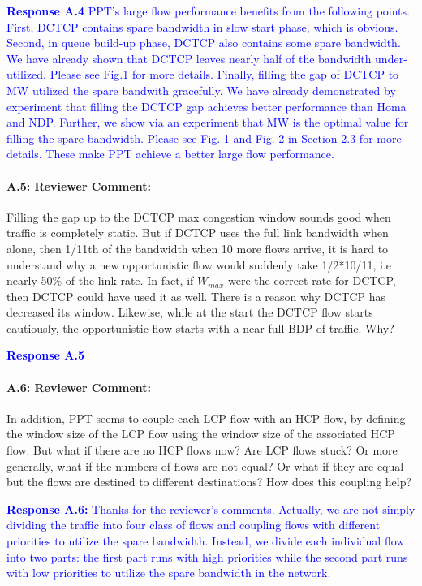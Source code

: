 \documentclass[12pt,one-column]{article}
\begin{document}
\noindent\textcolor{blue}{\textbf{Response A.4}
PPT's large flow performance benefits from the following points. 
First, DCTCP contains spare bandwidth in slow start phase, which is obvious.
Second, in queue build-up phase, DCTCP also contains some spare bandwidth. We have already shown that DCTCP leaves nearly half of the bandwidth under-utilized. Please see Fig.1 for more details.
Finally, filling the gap of DCTCP to MW utilized the spare bandwith gracefully. We have already demonstrated by experiment that filling the DCTCP gap achieves better performance than Homa and NDP.
Further, we show via an experiment that MW is the optimal value for filling the spare bandwidth.
Please see Fig. 1 and Fig. 2 in Section 2.3 for more details.
These make PPT achieve a better large flow performance.
} 

{\it \paragraph{A.5: Reviewer Comment:}Filling the gap up to the DCTCP max congestion window sounds good when traffic is completely static. But if DCTCP uses the full link bandwidth when alone, then 1/11th of the bandwidth when 10 more flows arrive, it is hard to understand why a new opportunistic flow would suddenly take 1/2*10/11, i.e nearly 50\% of the link rate. In fact, if $W_{max}$ were the correct rate for DCTCP, then DCTCP could have used it as well. There is a reason why DCTCP has decreased its window. Likewise, while at the start the DCTCP flow starts cautiously, the opportunistic flow starts with a near-full BDP of traffic. Why?}

\noindent\textcolor{blue}{\textbf{Response A.5}
} 


{\it \paragraph{A.6: Reviewer Comment:} In addition, PPT seems to couple each LCP flow with an HCP flow, by defining the window size of the LCP flow using the window size of the associated HCP flow. But what if there are no HCP flows now? Are LCP flows stuck? Or more generally, what if the numbers of flows are not equal? Or what if they are equal but the flows are destined to different destinations? How does this coupling help? }	

\noindent\textcolor{blue}{\textbf{Response A.6:} Thanks for the reviewer's comments. Actually, we are not simply dividing the traffic into four class of flows and coupling flows with different priorities to utilize the spare bandwidth. Instead, we divide each individual flow into two parts: the first part runs with high priorities while the second part runs with low priorities to utilize the spare bandwidth in the network.}
\end{document}
